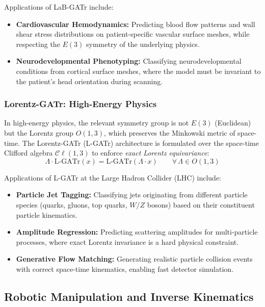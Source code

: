 \documentclass[manuscript, nonacm, review=false]{acmart}
\theoremstyle{definition}
\theoremstyle{plain}
\newcommand{\Cl}{\mathcal{C}\!\ell}
\begin{document}
Applications of LaB-GATr include:
\begin{itemize}
    \item \textbf{Cardiovascular Hemodynamics:} Predicting blood flow patterns and wall shear stress distributions on patient-specific vascular surface meshes, while respecting the $E(3)$ symmetry of the underlying physics.
    
    \item \textbf{Neurodevelopmental Phenotyping:} Classifying neurodevelopmental conditions from cortical surface meshes, where the model must be invariant to the patient's head orientation during scanning.
\end{itemize}

\subsubsection{Lorentz-GATr: High-Energy Physics}

In high-energy physics, the relevant symmetry group is not $E(3)$ (Euclidean) but the Lorentz group $O(1,3)$, which preserves the Minkowski metric of space-time. The Lorentz-GATr (L-GATr) architecture is formulated over the space-time Clifford algebra $\Cl(1,3)$ to enforce \emph{exact Lorentz equivariance}:
\begin{equation}
    \Lambda \cdot \text{L-GATr}(x) = \text{L-GATr}(\Lambda \cdot x) \qquad \forall\, \Lambda \in O(1,3)
\end{equation}

Applications of L-GATr at the Large Hadron Collider (LHC) include:
\begin{itemize}
    \item \textbf{Particle Jet Tagging:} Classifying jets originating from different particle species (quarks, gluons, top quarks, $W/Z$ bosons) based on their constituent particle kinematics.
    
    \item \textbf{Amplitude Regression:} Predicting scattering amplitudes for multi-particle processes, where exact Lorentz invariance is a hard physical constraint.
    
    \item \textbf{Generative Flow Matching:} Generating realistic particle collision events with correct space-time kinematics, enabling fast detector simulation.
\end{itemize}


\subsection{Robotic Manipulation and Inverse Kinematics}
\label{subsec:robotics}
\end{document}
